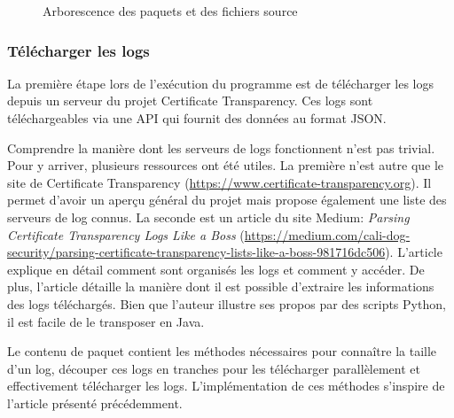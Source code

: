 \documentclass{article}
\begin{document}
\begin{figure}
\caption{Arborescence des paquets et des fichiers source}
\label{structure-fig}
\end{figure}


\subsubsection{Télécharger les logs}

La première étape lors de l'exécution du programme est de télécharger les logs depuis un serveur du projet Certificate Transparency.  Ces logs sont téléchargeables via une API qui fournit des données au format JSON.

Comprendre la manière dont les serveurs de logs fonctionnent n'est pas trivial.  Pour y arriver, plusieurs ressources ont été utiles.  La première n'est autre que le site de Certificate Transparency (\url{https://www.certificate-transparency.org}).  Il permet d'avoir un aperçu général du projet mais propose également une liste des serveurs de log connus.  La seconde est un article du site Medium: \emph{Parsing Certificate Transparency Logs Like a Boss} (\url{https://medium.com/cali-dog-security/parsing-certificate-transparency-lists-like-a-boss-981716dc506}).  L'article explique en détail comment sont organisés les logs et comment y accéder.  De plus, l'article détaille la manière dont il est possible d'extraire les informations des logs téléchargés.  Bien que l'auteur illustre ses propos par des scripts Python, il est facile de le transposer en Java.

Le contenu de paquet  contient les méthodes nécessaires pour connaître la taille d'un log, découper ces logs en tranches pour les télécharger parallèlement et effectivement télécharger les logs.  L'implémentation de ces méthodes s'inspire de l'article présenté précédemment.
\end{document}

